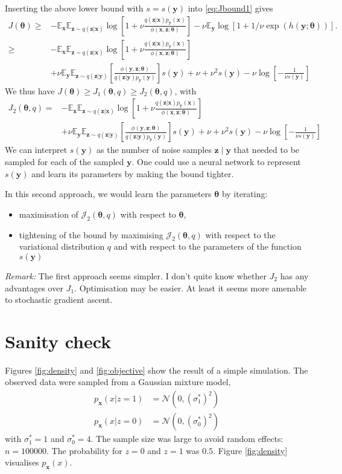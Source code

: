 \documentclass[11pt, oneside]{article}
\newcommand{\thetab}{{\boldsymbol{\theta}}}
\newcommand{\pnn}{\phi}
\newcommand{\pdata}{p_{ \mathbf x}}
\newcommand{\pnoise}{p_{ \mathbf y}}
\newcommand{\x}{{\mathbf x}}
\newcommand{\y}{{\mathbf y}}
\newcommand{\z}{{\mathbf z}}
\newcommand{\E}{\mathbb{E}}
\newcommand{\Ex}{\E_{\x}}
\newcommand{\Ey}{\E_{\y}}
\newcommand{\J}{\mathcal{J}}
\begin{document}
Inserting the above lower bound with $s=s(\y)$ into \eqref{eq:Jbound1} gives
\begin{align}
  J(\thetab)  \ge&  -\Ex \E_{\z \sim q(\z|\x)} \log \left[1+\nu \frac{q(\z|\x)\pnoise(\x)}{\pnn(\x,\z; \thetab)}\right] -  \nu \Ey \log \left[1+1/\nu \exp(h(\y;\thetab))\right].\\
  \ge&  -\Ex \E_{\z \sim q(\z|\x)} \log \left[1+\nu \frac{q(\z|\x)\pnoise(\x)}{\pnn(\x,\z; \thetab)}\right] \nonumber \\
  &+  \nu \Ey \E_{\z \sim q(\z|\y)} \left[\frac{\pnn(\y,\z; \thetab)}{q(\z|\y) \pnoise(\y)}\right]s(\y)  + \nu + \nu^2 s(\y) - \nu\log\left[ -\frac{1}{\nu s(\y)}\right]
\end{align}
We thus have $J(\thetab) \ge J_1(\thetab,q) \ge J_2(\thetab,q)$, with
\begin{align}
  J_2(\thetab,q) =&  -\Ex \E_{\z \sim q(\z|\x)} \log \left[1+\nu \frac{q(\z|\x)\pnoise(\x)}{\pnn(\x,\z; \thetab)}\right] \nonumber \\
  &+  \nu \Ey \E_{\z \sim q(\z|\y)} \left[\frac{\pnn(\y,\z; \thetab)}{q(\z|\y) \pnoise(\y)}\right]s(\y)  + \nu + \nu^2 s(\y) - \nu \log\left[ -\frac{1}{\nu s(\y)}\right]
  \label{eq:J2-def}
\end{align}
We can interpret $s(\y)$ as the number of noise samples $\z \mid \y$
that needed to be sampled for each of the sampled $\y$. One could use
a neural network to represent $s(\y)$ and learn its parameters by
making the bound tighter.

In this second approach, we would learn the parameters $\thetab$ by iterating:
\begin{itemize}
\item maximisation of $\J_2(\thetab,q)$ with respect to $\thetab$,
\item tightening of the bound by maximising $\J_2(\thetab,q)$ with respect to the variational distribution $q$ and with respect to the parameters of the function $s(\y)$
\end{itemize}

\emph{Remark:} The first approach seems simpler. I don't quite know whether $J_2$ has any advantages over $J_1$. Optimisation may be easier. At least it seems more amenable to stochastic gradient ascent.

\section{Sanity check}

Figures \ref{fig:density} and \ref{fig:objective} show the result of a simple simulation. The observed data were sampled from a Gaussian mixture model,
\begin{align}
  \pdata(x | z=1) &= \mathcal{N}(0,(\sigma_1^\ast)^2)\\
  \pdata(x | z=0) &= \mathcal{N}(0,(\sigma^\ast_0)^2)
  \end{align}
with  $\sigma_1^\ast = 1$ and $\sigma_0^\ast = 4$. The sample size was large to avoid random effects: $n = 100000$. The probability for $z=0$ and $z=1$ was $0.5$. Figure \ref{fig:density} visualises $\pdata(x)$.
\end{document}
